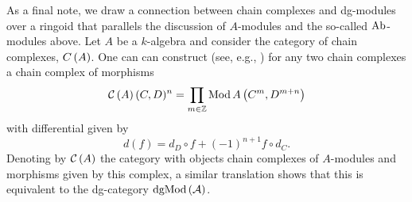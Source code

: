 As a final note, we draw a connection between chain complexes and dg-modules over a ringoid that parallels the discussion of $A$-modules and the so-called $\operatorname{Ab}$-modules above.
Let $A$ be a $k$-algebra and consider the category of chain complexes, $C\left(A\right)$.
One can can construct (see, e.g., \textcite{Weibel94}) for any two chain complexes a chain complex of morphisms
\[\mathcal{C}\left(A\right)(C,D)^n = \prod_{m \in \mathbb{Z}}\operatorname{Mod}A\left(C^m, D^{m + n}\right)\]
with differential given by
\[d(f) = d_D \circ f + (-1)^{n+1} f \circ d_C.\]
Denoting by $\mathcal{C}\left(A\right)$ the category with objects chain complexes of $A$-modules and morphisms given by this complex, a similar translation shows that this is equivalent to the dg-category $\operatorname{dgMod}\left(\mathcal{A}\right)$.

